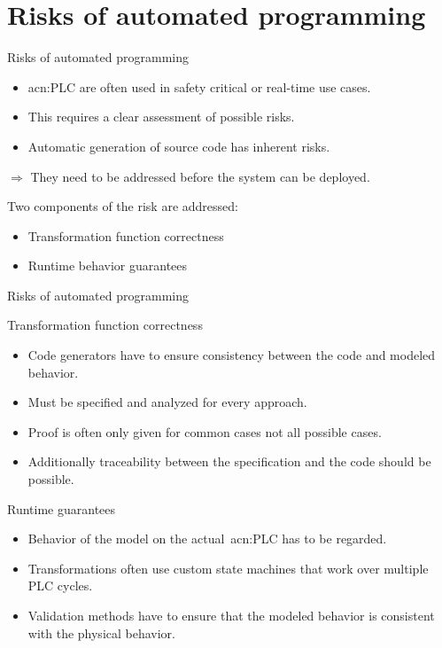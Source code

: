 \documentclass[18pt]{beamer}
\begin{document}
\section{Risks of automated programming}

\begin{frame}{Risks of automated programming}
\begin{itemize}
    \item \acrlong{acn:PLC} are often used in safety critical or real-time use cases.
    \item This requires a clear assessment of possible risks.
    \item Automatic generation of source code has inherent risks.
\end{itemize}
$\Rightarrow$ They need to be addressed before the system can be deployed.

Two components of the risk are addressed:
\begin{itemize}
    \item Transformation function correctness
    \item Runtime behavior guarantees
\end{itemize}
\end{frame}

\begin{frame}{Risks of automated programming}

\begin{block}{Transformation function correctness}
	\begin{itemize}
		\item Code generators have to ensure consistency between the code and modeled behavior.
		\item Must be specified and analyzed for every approach.
        \item Proof is often only given for common cases not all possible cases.
        \item Additionally traceability between the specification and the code should be possible.
	\end{itemize}
\end{block}
\pause
\begin{block}{Runtime guarantees}
    \begin{itemize}
        \item Behavior of the model on the actual~\acrshort{acn:PLC} has to be regarded.
        \item Transformations often use custom state machines that work over multiple PLC cycles.
        \item Validation methods have to ensure that the modeled behavior is consistent with the physical behavior.
    \end{itemize}
\end{block}
\end{frame}
\end{document}
